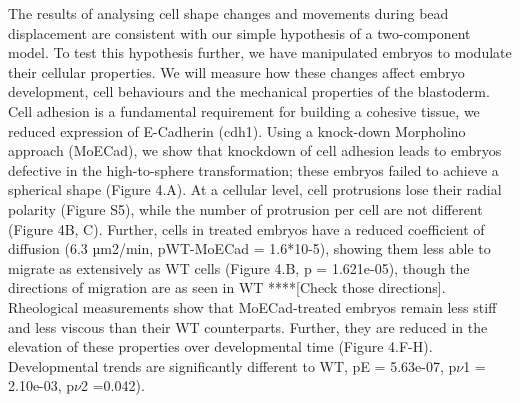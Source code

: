 The results of analysing cell shape changes and movements during bead displacement are consistent with our simple hypothesis of a two-component model.
To test this hypothesis further, we have manipulated embryos to modulate their cellular properties.
We will measure how these changes affect embryo development, cell behaviours and the mechanical properties of the blastoderm.
Cell adhesion is a fundamental requirement for building a cohesive tissue, we reduced expression of E-Cadherin (cdh1).
Using a knock-down Morpholino approach (MoECad), we show that knockdown of cell adhesion leads to embryos defective in the high-to-sphere transformation; these embryos failed to achieve a spherical shape (Figure 4.A).
At a cellular level, cell protrusions lose their radial polarity (Figure S5), while the number of protrusion per cell are not different (Figure 4B, C).
Further, cells in treated embryos have a reduced coefficient of diffusion (6.3 µm2/min, pWT-MoECad = 1.6*10-5), showing them less able to migrate as extensively as WT cells (Figure 4.B, p = 1.621e-05), though the directions of migration are as seen in WT ****[Check those directions].
Rheological measurements show that MoECad-treated embryos remain less stiff and less viscous than their WT counterparts.
Further, they are reduced in the elevation of these properties over developmental time (Figure 4.F-H).
Developmental trends are significantly different to WT, pE = 5.63e-07, p$\nu$1 = 2.10e-03, p$\nu$2 =0.042).

